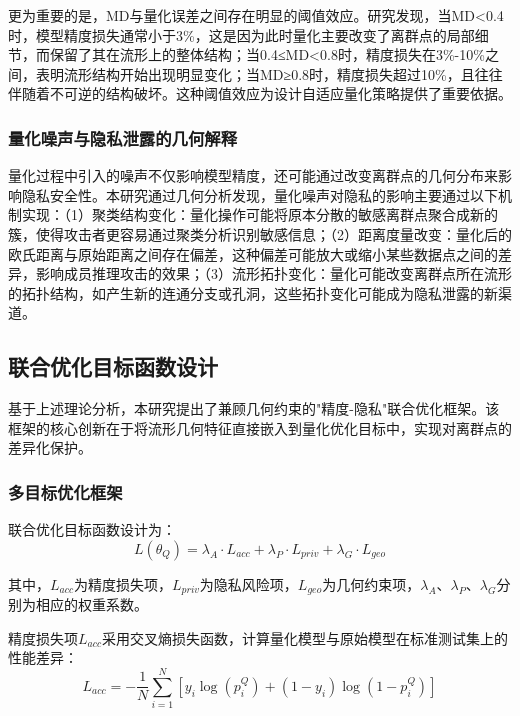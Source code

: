更为重要的是，MD与量化误差之间存在明显的阈值效应。研究发现，当MD<0.4时，模型精度损失通常小于3\%，这是因为此时量化主要改变了离群点的局部细节，而保留了其在流形上的整体结构；当0.4≤MD<0.8时，精度损失在3\%-10\%之间，表明流形结构开始出现明显变化；当MD≥0.8时，精度损失超过10\%，且往往伴随着不可逆的结构破坏。这种阈值效应为设计自适应量化策略提供了重要依据。

\subsubsection{量化噪声与隐私泄露的几何解释}

量化过程中引入的噪声不仅影响模型精度，还可能通过改变离群点的几何分布来影响隐私安全性。本研究通过几何分析发现，量化噪声对隐私的影响主要通过以下机制实现：（1）聚类结构变化：量化操作可能将原本分散的敏感离群点聚合成新的簇，使得攻击者更容易通过聚类分析识别敏感信息；（2）距离度量改变：量化后的欧氏距离与原始距离之间存在偏差，这种偏差可能放大或缩小某些数据点之间的差异，影响成员推理攻击的效果；（3）流形拓扑变化：量化可能改变离群点所在流形的拓扑结构，如产生新的连通分支或孔洞，这些拓扑变化可能成为隐私泄露的新渠道。

\subsection{联合优化目标函数设计}

基于上述理论分析，本研究提出了兼顾几何约束的"精度-隐私"联合优化框架。该框架的核心创新在于将流形几何特征直接嵌入到量化优化目标中，实现对离群点的差异化保护。

\subsubsection{多目标优化框架}

联合优化目标函数设计为：
\begin{equation}
L(\theta_Q) = \lambda_A \cdot L_{acc} + \lambda_P \cdot L_{priv} + \lambda_G \cdot L_{geo}
\end{equation}

其中，$L_{acc}$为精度损失项，$L_{priv}$为隐私风险项，$L_{geo}$为几何约束项，$\lambda_A$、$\lambda_P$、$\lambda_G$分别为相应的权重系数。

精度损失项$L_{acc}$采用交叉熵损失函数，计算量化模型与原始模型在标准测试集上的性能差异：
\begin{equation}
L_{acc} = -\frac{1}{N}\sum_{i=1}^N [y_i \log(p_i^Q) + (1-y_i) \log(1-p_i^Q)]
\end{equation}

